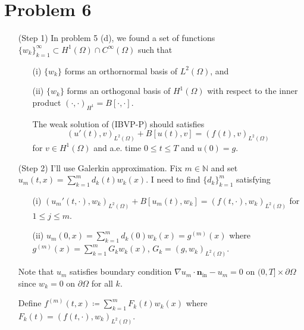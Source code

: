 \documentclass{article}
\begin{document}
\section*{Problem 6}
\begin{enumerate}
\item[(Step 1)] In problem 5 (d), we found a set of functions $\{w_k\}_{k=1}^\infty\subset H^1(\Omega)\cap C^\infty (\Omega)$ such that
\begin{enumerate}
\item[(i)] $\{w_k\}$ forms an orthornormal basis of $L^2(\Omega)$, and
\item[(ii)] $\{w_k\}$ forms an orthogonal basis of $H^1(\Omega)$ with respect to the inner product $(\cdot,\cdot)_{H^1}=B[\cdot,\cdot]$.

The weak solution of (IBVP-P) should satisfies
\begin{equation*}
(u'(t),v)_{L^2(\Omega)}+B[u(t),v]=(f(t),v)_{L^2(\Omega)}
\end{equation*}
for $v\in H^1(\Omega)$ and a.e. time $0\leq t\leq T$ and $u(0)=g$.
\end{enumerate}
\item[(Step 2)] I'll use Galerkin approximation. Fix $m\in \mathbb{N}$ and set $u_m(t,x)=\sum\limits_{k=1}^m d_k(t)w_k(x)$. I need to find $\{d_k\}_{k=1}^m$ satisfying
\begin{enumerate}
\item[(i)] $(u_m'(t,\cdot),w_k)_{L^2(\Omega)}+B[u_m(t), w_k]=(f(t,\cdot), w_k)_{L^2(\Omega)}$ for $1\leq j\leq m$.
\item[(ii)] $u_m(0,x)=\sum\limits_{k=1}^m d_k(0)w_k(x)=g^{(m)}(x)$ where $g^{(m)}(x)=\sum\limits_{k=1}^m G_k w_k(x)$, $G_k=(g, w_k)_{L^2(\Omega)}$.
\end{enumerate}
Note that $u_m$ satisfies boundary condition $\nabla u_m\cdot \bm{n}_{\text{in}}-u_m=0$ on $(0,T]\times \partial \Omega$ since $w_k=0$ on $\partial \Omega$ for all $k$.

Define $f^{(m)}(t,x)\coloneqq \sum\limits_{k=1}^m F_k(t)w_k(x)$ where $F_k(t)=(f(t, \cdot),w_k)_{L^2(\Omega)}$.


\end{enumerate}
\end{document}
